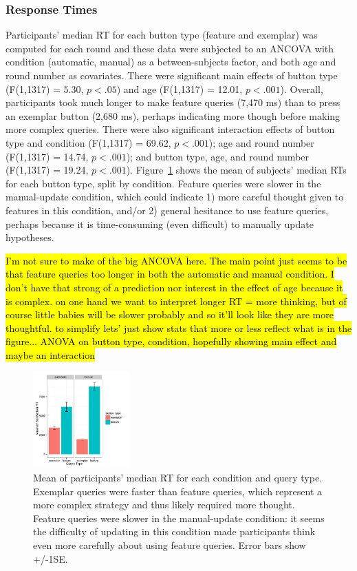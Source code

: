 \documentclass[10pt,letterpaper]{article}
\begin{document}
\subsubsection{Response Times}

Participants' median RT for each button type (feature and exemplar) was computed 
for each round and these data were subjected to an ANCOVA with condition (automatic, manual) as a 
between-subjects factor, and both age and round number as covariates. There
were significant main effects of button type (F(1,1317) = 5.30, $p<.
05$) and age (F(1,1317) = 12.01, $p<.001$). Overall, participants took much longer to 
make feature queries (7,470 ms) than to press an exemplar button (2,680 ms), 
perhaps indicating more though before making more complex queries. There were also significant 
interaction effects of button type and condition (F(1,1317) = 69.62, $p<.001$); age 
and round number (F(1,1317) = 14.74, $p<.001$); and button type, age, and round 
number (F(1,1317) = 19.24, $p<.001$). Figure~\ref{fig:basic-rt} shows the mean of 
subjects' median RTs for each button type, split by condition. Feature queries were 
slower in the manual-update condition, which could indicate 1) more careful thought 
given to features in this condition, and/or 2) general hesitance to use feature 
queries, perhaps because it is time-consuming (even difficult) to manually update 
hypotheses. 

\hl{I'm not sure to make of the big ANCOVA here.  The main point just seems to be that
feature queries too longer in both the automatic and manual condition.  I don't have
that strong of a prediction nor interest in the effect of age because it is complex.  on
one hand we want to interpret longer RT = more thinking, but of course little babies
will be slower probably and so it'll look like they are more thoughtful.  to simplify
lets' just show stats that more or less reflect what is in the figure...  ANOVA on
button type, condition, hopefully showing main effect and maybe an interaction}

\begin{figure}[h]
  \centering
  \includegraphics[width=0.33\textwidth]{figures/RT_by_condition_query_type}
  \caption{Mean of participants' median RT for each condition and query type. 
Exemplar queries were faster than feature queries, which represent a more complex 
strategy and thus likely required more thought. Feature queries were slower in the 
manual-update condition: it seems the difficulty of updating in this condition made 
participants think even more carefully about using feature queries. Error bars show 
+/-1SE.}
  \label{fig:basic-rt}
\end{figure} 
\end{document}
